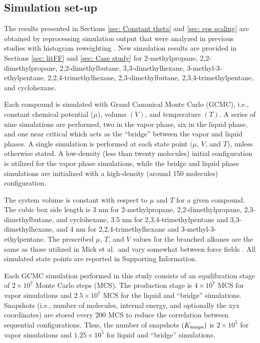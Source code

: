 \documentclass[journal=jced,manuscript=article]{achemso}
\begin{document}
\subsection{Simulation set-up} \label{sec: Simulation set-up}

The results presented in Sections \ref{sec: Constant theta} and \ref{sec: eps scaling} are obtained by reprocessing simulation output that were analyzed in previous studies with histogram reweighting \cite{Potoff_branched,Barhaghi2017}. New simulation results are provided in Sections \ref{sec: litFF} and \ref{sec: Case study} for 2-methylpropane, 2,2-dimethylpropane, 2,2-dimethylbutane, 3,3-dimethylhexane, 3-methyl-3-ethylpentane, 2,2,4-trimethylhexane, 2,3-dimethylbutane, 2,3,4-trimethylpentane, and cyclohexane. 

Each compound is simulated with Grand Canonical Monte Carlo (GCMC), i.e., constant chemical potential ($\mu$), volume $(V)$, and temperature $(T)$. A series of nine simulations are performed, two in the vapor phase, six in the liquid phase, and one near critical which acts as the ``bridge'' between the vapor and liquid phases. A single simulation is performed at each state point $(\mu$, $V$, and $T)$, unless otherwise stated. A low-density (less than twenty molecules) initial configuration is utilized for the vapor phase simulations, while the bridge and liquid phase simulations are initialized with a high-density (around 150 molecules) configuration. 

The system volume is constant with respect to $\mu$ and $T$ for a given compound. The cubic box side length is 3 nm for 2-methylpropane, 2,2-dimethylpropane, 2,3-dimethylbutane, and cyclohexane, 3.5 nm for 2,3,4-trimethylpentane and 3,3-dimethylhexane, and 4 nm for 2,2,4-trimethylhexane and 3-methyl-3-ethylpentane. The prescribed $\mu$, $T$, and $V$ values for the branched alkanes are the same as those utilized in Mick et al.~and vary somewhat between force fields \cite{Potoff_branched}. All simulated state points are reported in Supporting Information. 


Each GCMC simulation performed in this study consists of an equilibration stage of $2 \times 10^7$ Monte Carlo steps (MCS). The production stage is $4 \times 10^7$ MCS for vapor simulations and $2.5 \times 10^7$ MCS for the liquid and ``bridge'' simulations. Snapshots (i.e., number of molecules, internal energy, and optionally the xyz coordinates) are stored every 200 MCS to reduce the correlation between sequential configurations. Thus, the number of snapshots $(K_{\rm snaps})$ is $2 \times 10^5$ for vapor simulations and $1.25 \times 10^5$ for liquid and ``bridge'' simulations. 
\end{document}
